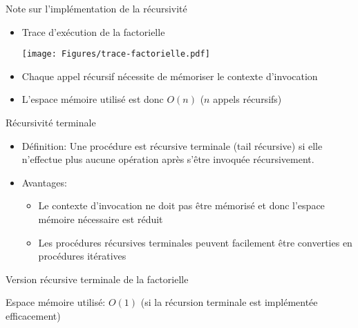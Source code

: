\begin{frame}{Note sur l'implémentation de la récursivité}
\begin{itemize}
\item Trace d'exécution de la factorielle
\centerline{\texttt{[image: Figures/trace-factorielle.pdf]}}
\item Chaque appel récursif nécessite de mémoriser le \alert{contexte d'invocation}
\item L'espace mémoire utilisé est donc $O(n)$ ($n$ appels récursifs)
\end{itemize}
\end{frame}

\begin{frame}{Récursivité terminale}

\begin{itemize}
\item Définition: Une procédure est \alert{récursive terminale} (tail récursive) si elle n'effectue plus aucune opération après s'être invoquée récursivement.

\bigskip

\item Avantages:
\begin{itemize}
\item Le contexte d'invocation ne doit pas être mémorisé et donc l'espace mémoire nécessaire est réduit
\item Les procédures récursives terminales peuvent facilement être converties en procédures itératives
\end{itemize}
\end{itemize}

\end{frame}

\begin{frame}{Version récursive terminale de la factorielle}

\begin{center}
\end{center}

\begin{center}
\end{center}

\bigskip

Espace mémoire utilisé: $O(1)$ (si la récursion terminale est implémentée efficacement)


\end{frame}

